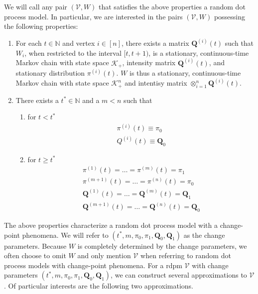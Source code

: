 \documentclass[draftcls]{IEEEtran}
\theoremstyle{definition}
\begin{document}
We will call any pair $(\mathscr{V}, W)$ that satisfies the above
properties a random dot process model.  In particular, we are
interested in the pairs $(\mathscr{V}, W)$ possessing the following
properties:
\begin{enumerate}
\item For each $t \in \mathbb{N}$ and vertex $i \in [n]$, there exists
  a matrix $\mathbf{Q}^{(i)}(t)$ such that $W_i$, when restricted to
  the interval $[t, t+1)$, is a stationary, continuous-time Markov
  chain with state space $\mathscr{K}_+$, intensity matrix
  ${\mathbf{Q}^{(i)}(t)}$, and stationary distribution
  $\pi^{(i)}(t)$. $W$ is thus a stationary, continuous-time Markov chain with state
  space $\mathscr{K}_{+}^{n}$ and intentisy matrix
  $\otimes_{i=1}^{n}\mathbf{Q}^{(i)}(t)$.
\item There exists a $t^{*} \in \mathbb{N}$ and a $m < n$ such that 
  \begin{enumerate}
  \item for  $t < t^{*}$
    \begin{gather*}
      \pi^{(i)}(t) \equiv \pi_0 \\
      Q^{(i)}(t) \equiv \mathbf{Q}_0
    \end{gather*}
  \item  for $t \geq t^{*}$
    \begin{gather*}
      \pi^{(1)}(t) = \dots = \pi^{(m)}(t) = \pi_1 \\
      \pi^{(m+1)}(t)  = \dots = \pi^{(n)}(t) = \pi_0 \\
      \mathbf{Q}^{(1)}(t)  = \dots = \mathbf{Q}^{(m)}(t) = \mathbf{Q}_1 \\
      \mathbf{Q}^{(m+1)}(t) = \dots = \mathbf{Q}^{(n)}(t) = \mathbf{Q}_0 
    \end{gather*}
  \end{enumerate}
\end{enumerate}
The above properties characterize a random dot process model with a
change-point phenomena. We will refer to $(t^{*}, m, \pi_0, \pi_1,
\mathbf{Q}_0, \mathbf{Q}_1)$ as the change parameters. Because $W$ is completely
determined by the change parameters, we often choose to omit $W$ and
only mention $\mathscr{V}$ when referring to random dot process models
with change-point phenomena. For a rdpm $\mathscr{V}$ with change
parameters $(t^{*}, m, \pi_0, \pi_1, \mathbf{Q}_0, \mathbf{Q}_1)$, we can construct
several approximations to $\mathscr{V}$. Of particular interests are the
following two approximations.
\end{document}

